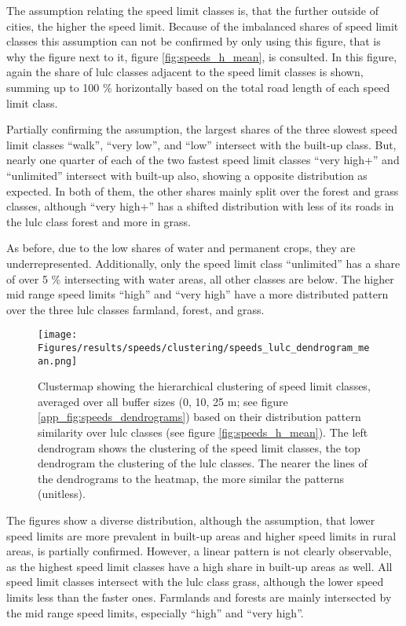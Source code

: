 The assumption relating the speed limit classes is, that the further outside of cities, the higher the speed limit. Because of the imbalanced shares of speed limit classes this assumption can not be confirmed by only using this figure, that is why the figure next to it, figure \ref{fig:speeds_h_mean}, is consulted. In this figure, again the share of \gls{lulc} classes adjacent to the speed limit classes is shown, summing up to 100 \% horizontally based on the total road length of each speed limit class.

Partially confirming the assumption, the largest shares of the three slowest speed limit classes \enquote{walk}, \enquote{very low}, and \enquote{low} intersect with the built-up class. But, nearly one quarter of each of the two fastest speed limit classes \enquote{very high+} and \enquote{unlimited} intersect with built-up also, showing a opposite distribution as expected. In both of them, the other shares mainly split over the forest and grass classes, although \enquote{very high+} has a shifted distribution with less of its roads in the \gls{lulc} class forest and more in grass.

As before, due to the low shares of water and permanent crops, they are underrepresented. Additionally, only the speed limit class \enquote{unlimited} has a share of over 5 \% intersecting with water areas, all other classes are below. The higher mid range speed limits \enquote{high} and \enquote{very high} have a more distributed pattern over the three \gls{lulc} classes farmland, forest, and grass.

\begin{figure}[htb]
    \centering
    \texttt{[image: Figures/results/speeds/clustering/speeds\_lulc\_dendrogram\_mean.png]}
    \caption[Clustermap of Speed Limit Classes vs.  Classes]{Clustermap showing the hierarchical clustering of speed limit classes, averaged over all buffer sizes (0, 10, 25 m; see figure \ref{app_fig:speeds_dendrograms}) based on their distribution pattern similarity over \gls{lulc} classes (see figure \ref{fig:speeds_h_mean}). The left dendrogram shows the clustering of the speed limit classes, the top dendrogram the clustering of the \gls{lulc} classes. The nearer the lines of the dendrograms to the heatmap, the more similar the patterns (unitless).}
    \label{fig:speeds_clustermap}
\end{figure}

The figures show a diverse distribution, although the assumption, that lower speed limits are more prevalent in built-up areas and higher speed limits in rural areas, is partially confirmed. However, a linear pattern is not clearly observable, as the highest speed limit classes have a high share in built-up areas as well. All speed limit classes intersect with the \gls{lulc} class grass, although the lower speed limits less than the faster ones. Farmlands and forests are mainly intersected by the mid range speed limits, especially \enquote{high} and \enquote{very high}. 

